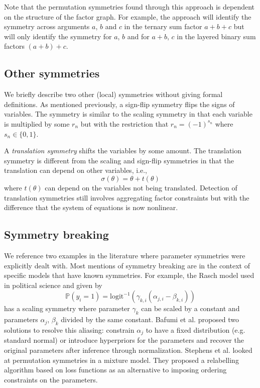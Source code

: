Note that the permutation symmetries found through this approach is dependent on the structure of the factor graph. For example, the approach will identify the symmetry across arguments $a$, $b$ and $c$ in the ternary sum factor $a+b+c$ but will only identify the symmetry for $a$, $b$ and for $a+b$, $c$ in the layered binary sum factors $(a+b)+c$.


\subsection{Other symmetries}

We briefly describe two other (local) symmetries without giving formal definitions. As mentioned previously, a sign-flip symmetry flips the signs of variables. The symmetry is similar to the scaling symmetry in that each variable is multiplied by some $r_n$ but with the restriction that $r_n=(-1)^{s_n}$ where $s_n\in\{0,1\}$.


A \textit{translation symmetry} shifts the variables by some amount. The translation symmetry is different from the scaling and sign-flip symmetries in that the translation can depend on other variables, i.e.,
\[
\sigma(\theta)=\theta+t(\theta)
\]
where $t(\theta)$ can depend on the variables not being translated. Detection of translation symmetries still involves aggregating factor constraints but with the difference that the system of equations is now nonlinear.


\subsection{Symmetry breaking}

We reference two examples in the literature where parameter symmetries were explicitly dealt with. Most mentions of symmetry breaking are in the context of specific models that have known symmetries. For example, the Rasch model used in political science and given by
\[
\mathbb{P}(y_i=1) = \text{logit}^{-1}\left(\gamma_{k,i}(\alpha_{j,i}-\beta_{k,i})\right)
\]
has a scaling symmetry where parameter $\gamma_k$ can be scaled by a constant and parameters $\alpha_j$, $\beta_k$ divided by the same constant. Bafumi et al. \cite{Bafumi:2005} proposed two solutions to resolve this aliasing: constrain $\alpha_j$ to have a fixed distribution (e.g. standard normal) or introduce hyperpriors for the parameters and recover the original parameters after inference through normalization. Stephens et al. \cite{Stephens:2000} looked at permutation symmetries in a mixture model. They proposed a relabelling algorithm based on loss functions as an alternative to imposing ordering constraints on the parameters.

